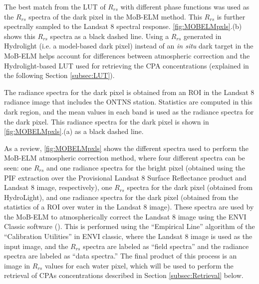 \documentclass[onecolumn,3p,letterpaper]{elsarticle}
\begin{document}
The best match from the LUT of $R_{rs}$ with different phase functions was used as the $R_{rs}$ spectra of the dark pixel in the MoB-ELM method. This $R_{rs}$ is further spectrally sampled to the Landsat 8 spectral response. \autoref{fig:MOBELMpxls}.(b)~ shows this $R_{rs}$ spectra as a black dashed line. Using a $R_{rs}$ generated in Hydrolight (i.e. a model-based dark pixel) instead of an {\it in situ} dark target in the MoB-ELM helps account for differences between atmospheric correction and the Hydrolight-based LUT used for retrieving the CPA concentrations (explained in the following Section \ref{subsec:LUT}).

The radiance spectra for the dark pixel is obtained from an ROI in the Landsat 8 radiance image that includes the ONTNS station. Statistics are computed in this dark region, and the mean values in each band is used as the radiance spectra for the dark pixel. This radiance spectra for the dark pixel is shown in \autoref{fig:MOBELMpxls}.(a) as a black dashed line.

As a review, \autoref{fig:MOBELMpxls} shows the different spectra used to perform the MoB-ELM atmospheric correction method, where four different spectra can be seen: one $R_{rs}$ and one radiance spectra for the bright pixel (obtained using the PIF extraction over the Provisional Landsat 8 Surface Reflectance product and Landsat 8 image, respectively), one $R_{rs}$ spectra for the dark pixel (obtained from HydroLight), and one radiance spectra for the dark pixel (obtained from the statistics of a ROI over water in the Landsat 8 image). These spectra are used by the MoB-ELM to atmospherically correct the Landsat 8 image using the ENVI Classic software (\cite{ENVIUserGuide}). This is performed using the ``Empirical Line'' algorithm of the ``Calibration Utilities'' in ENVI classic, where the Landsat 8 image is used as the input image, and the $R_{rs}$ spectra are labeled as ``field spectra'' and the radiance spectra are labeled as ``data spectra.'' The final product of this process is an image in $R_{rs}$ values for each water pixel, which will be used to perform the retrieval of CPAs concentrations described in Section \ref{subsec:Retrieval} below. 

\end{document}
